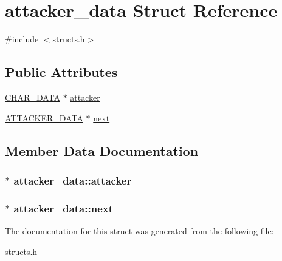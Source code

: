 \hypertarget{structattacker__data}{\section{attacker\-\_\-data Struct Reference}
\label{structattacker__data}
}


{\ttfamily \#include $<$structs.\-h$>$}

\subsection*{Public Attributes}
\begin{DoxyCompactItemize}
\item 
\hyperlink{structs_8h_af33ed1e66e8541a08bed257124f50f31}{C\-H\-A\-R\-\_\-\-D\-A\-T\-A} $\ast$ \hyperlink{structattacker__data_ae3e5412279eb6e9448444b55d91b99ef}{attacker}
\item 
\hyperlink{structs_8h_a72de0d7a32d309e37b0abace8b26b98c}{A\-T\-T\-A\-C\-K\-E\-R\-\_\-\-D\-A\-T\-A} $\ast$ \hyperlink{structattacker__data_a7e1f3346555d66902c72ded2c763c039}{next}
\end{DoxyCompactItemize}


\subsection{Member Data Documentation}
\hypertarget{structattacker__data_ae3e5412279eb6e9448444b55d91b99ef}{
\subsubsection[{attacker}]{$\ast$ attacker\-\_\-data\-::attacker}}\label{structattacker__data_ae3e5412279eb6e9448444b55d91b99ef}
\hypertarget{structattacker__data_a7e1f3346555d66902c72ded2c763c039}{
\subsubsection[{next}]{$\ast$ attacker\-\_\-data\-::next}}\label{structattacker__data_a7e1f3346555d66902c72ded2c763c039}


The documentation for this struct was generated from the following file\-:\begin{DoxyCompactItemize}
\item 
\hyperlink{structs_8h}{structs.\-h}\end{DoxyCompactItemize}
